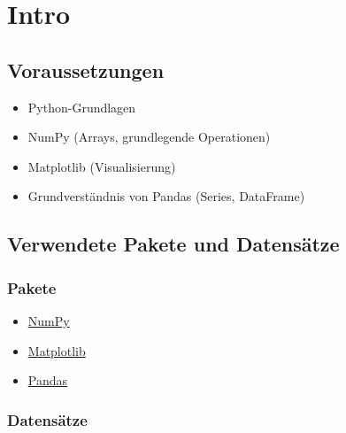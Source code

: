 \documentclass[
  ngerman,
  letterpaper,
  DIV=11]{scrreprt}
\providecommand{\tightlist}{%
  \setlength{\itemsep}{0pt}\setlength{\parskip}{0pt}}
\begin{document}

\chapter*{Intro}\label{intro}


\section*{Voraussetzungen}\label{voraussetzungen}


\begin{itemize}
\tightlist
\item
  Python-Grundlagen
\item
  NumPy (Arrays, grundlegende Operationen)
\item
  Matplotlib (Visualisierung)
\item
  Grundverständnis von Pandas (Series, DataFrame)
\end{itemize}

\section*{Verwendete Pakete und
Datensätze}\label{verwendete-pakete-und-datensuxe4tze}


\subsection*{Pakete}\label{pakete}

\begin{itemize}
\tightlist
\item
  \href{https://numpy.org/}{NumPy}
\item
  \href{https://matplotlib.org/}{Matplotlib}
\item
  \href{https://pandas.pydata.org/}{Pandas}
\end{itemize}

\subsection*{Datensätze}\label{datensuxe4tze}
\end{document}
